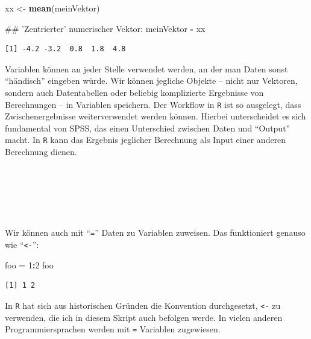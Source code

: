 \documentclass[12pt,]{tufte-book}
\newenvironment{Shaded}{\begin{snugshade}}{\end{snugshade}}
\newcommand{\KeywordTok}[1]{\textcolor[rgb]{0.13,0.29,0.53}{\textbf{#1}}}
\newcommand{\DecValTok}[1]{\textcolor[rgb]{0.00,0.00,0.81}{#1}}
\newcommand{\StringTok}[1]{\textcolor[rgb]{0.31,0.60,0.02}{#1}}
\newcommand{\OperatorTok}[1]{\textcolor[rgb]{0.81,0.36,0.00}{\textbf{#1}}}
\newcommand{\NormalTok}[1]{#1}
\theoremstyle{definition}
\theoremstyle{definition}
\theoremstyle{definition}
\theoremstyle{remark}
\begin{document}
\begin{Shaded}
\begin{Highlighting}[]
\NormalTok{xx <-}\StringTok{ }\KeywordTok{mean}\NormalTok{(meinVektor)}

\NormalTok{## 'Zentrierter' numerischer Vektor:}
\NormalTok{meinVektor }\OperatorTok{-}\StringTok{ }\NormalTok{xx}
\end{Highlighting}
\end{Shaded}

\begin{verbatim}
[1] -4.2 -3.2  0.8  1.8  4.8
\end{verbatim}

Variablen können an jeder Stelle verwendet werden, an der man Daten
sonst ``händisch'' eingeben würde. Wir können jegliche Objekte -- nicht
nur Vektoren, sondern auch Datentabellen oder beliebig komplizierte
Ergebnisse von Berechnungen -- in Variablen speichern. Der Workflow in
\texttt{R} ist so ausgelegt, dass Zwischenergebnisse weiterverwendet
werden können. Hierbei unterscheidet es sich fundamental von SPSS, das
einen Unterschied zwischen Daten und ``Output'' macht. In \texttt{R}
kann das Ergebnis jeglicher Berechnung als Input einer anderen
Berechnung dienen.

~


~

~

Wir können auch mit ``\texttt{=}'' Daten zu Variablen zuweisen. Das
funktioniert genauso wie ``\texttt{\textless{}-}'':

\begin{Shaded}
\begin{Highlighting}[]
\NormalTok{foo =}\StringTok{ }\DecValTok{1}\OperatorTok{:}\DecValTok{2}
\NormalTok{foo}
\end{Highlighting}
\end{Shaded}

\begin{verbatim}
[1] 1 2
\end{verbatim}

In \texttt{R} hat sich aus historischen Gründen die Konvention
durchgesetzt, \texttt{\textless{}-} zu verwenden, die ich in diesem
Skript auch befolgen werde. In vielen anderen Programmiersprachen werden
mit \texttt{=} Variablen zugewiesen.
\end{document}
